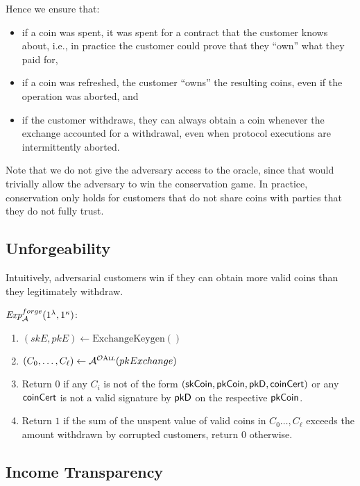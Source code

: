 Hence we ensure that:
\begin{itemize}
  \item if a coin was spent, it was spent for a contract that the customer
    knows about, i.e., in practice the customer could prove that they ``own'' what they
    paid for,
  \item if a coin was refreshed, the customer ``owns'' the resulting coins,
    even if the operation was aborted, and
  \item if the customer withdraws, they can always obtain a coin whenever the
    exchange accounted for a withdrawal, even when protocol executions are
    intermittently aborted.
\end{itemize}

Note that we do not give the adversary access to the  oracle, since
that would trivially allow the adversary to win the conservation game.  In
practice, conservation only holds for customers that do not share coins with
parties that they do not fully trust.

\subsection{Unforgeability}

Intuitively, adversarial customers win if they can obtain more valid coins than
they legitimately withdraw.

\begin{mdframed}
\small
\noindent $\mathit{Exp}_{\cal A}^{forge}(1^\lambda, 1^\kappa)$:
\vspace{-0.5\topsep}
\begin{enumerate}
  \setlength\itemsep{0em}
  \item $(skE, pkE) \leftarrow \mathrm{ExchangeKeygen}()$
  \item $(C_0, \dots, C_\ell) \leftarrow \mathcal{A}^{\mathcal{O}\textsc{All}}(pkExchange)$
  \item Return $0$ if any $C_i$ is not of the form $(\mathsf{skCoin}, \mathsf{pkCoin}, \mathsf{pkD}, \mathsf{coinCert})$
    or any $\mathsf{coinCert}$ is not a valid signature by $\mathsf{pkD}$ on the respective $\mathsf{pkCoin}$.
  \item Return $1$ if the sum of the unspent value of valid coins in $C_0
    \dots, C_\ell$ exceeds the amount withdrawn by corrupted
    customers, return $0$ otherwise.
\end{enumerate}
\end{mdframed}


\subsection{Income Transparency}

